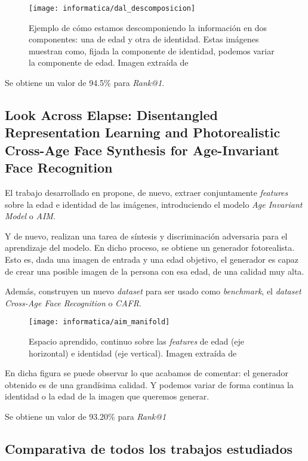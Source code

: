 \begin{figure}[H]
    \centering
    \texttt{[image: informatica/dal\_descomposicion]}
    \caption{Ejemplo de cómo estamos descomponiendo la información en dos componentes: una de edad y otra de identidad. Estas imágenes muestran como, fijada la componente de identidad, podemos variar la componente de edad. Imagen extraída de \cite{informatica:dal}}
\end{figure}

Se obtiene un valor de 94.5\% para \textit{Rank@1}.

\subsection{Look Across Elapse: Disentangled Representation Learning and Photorealistic Cross-Age Face Synthesis for Age-Invariant Face Recognition}

El trabajo desarrollado en \cite{informatica:aim} propone, de nuevo, extraer conjuntamente \textit{features} sobre la edad e identidad de las imágenes, introduciendo el modelo \textit{Age Invariant Model} o \textit{AIM}.

Y de nuevo, realizan una tarea de síntesis y discriminación adversaria para el aprendizaje del modelo. En dicho proceso, se obtiene un generador fotorealista. Esto es, dada una imagen de entrada y una edad objetivo, el generador es capaz de crear una posible imagen de la persona con esa edad, de una calidad muy alta.

Además, construyen un nuevo \textit{dataset} para ser usado como \textit{benchmark}, el \textit{dataset} \textit{Cross-Age Face Recognition} o \textit{CAFR}.

\begin{figure}[H]
    \centering
    \texttt{[image: informatica/aim\_manifold]}
    \caption{Espacio aprendido, continuo sobre las \textit{features} de edad (eje horizontal) e identidad (eje vertical). Imagen extraída de \cite{informatica:aim}}
\end{figure}

En dicha figura se puede observar lo que acabamos de comentar: el generador obtenido es de una grandísima calidad. Y podemos variar de forma continua la identidad o la edad de la imagen que queremos generar.

Se obtiene un valor de 93.20\% para \textit{Rank@1}

\subsection{Comparativa de todos los trabajos estudiados}


